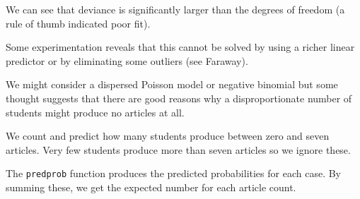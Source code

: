 \documentclass[
  ignorenonframetext,
]{beamer}
\newenvironment{Shaded}{\begin{snugshade}}{\end{snugshade}}
\newcommand{\DecValTok}[1]{\textcolor[rgb]{0.00,0.00,0.81}{#1}}
\newcommand{\FunctionTok}[1]{\textcolor[rgb]{0.00,0.00,0.00}{#1}}
\newcommand{\NormalTok}[1]{#1}
\newcommand{\OtherTok}[1]{\textcolor[rgb]{0.56,0.35,0.01}{#1}}
\newcommand{\SpecialCharTok}[1]{\textcolor[rgb]{0.00,0.00,0.00}{#1}}
\begin{document}
\begin{frame}{}
\protect\hypertarget{section-29}{}
We can see that deviance is significantly larger than the degrees of
freedom (a rule of thumb indicated poor fit).

\vspace{12pt}

Some experimentation reveals that this cannot be solved by using a
richer linear predictor or by eliminating some outliers (see Faraway).

\vspace{12pt}

We might consider a dispersed Poisson model or negative binomial but
some thought suggests that there are good reasons why a disproportionate
number of students might produce no articles at all.
\end{frame}

\begin{frame}[fragile]{}
\protect\hypertarget{section-30}{}
We count and predict how many students produce between zero and seven
articles. Very few students produce more than seven articles so we
ignore these.

\vspace{12pt}

The \texttt{predprob} function produces the predicted probabilities for
each case. By summing these, we get the expected number for each article
count.

\vspace{12pt}
\tiny

\begin{Shaded}
\end{Shaded}
\end{frame}
\end{document}
